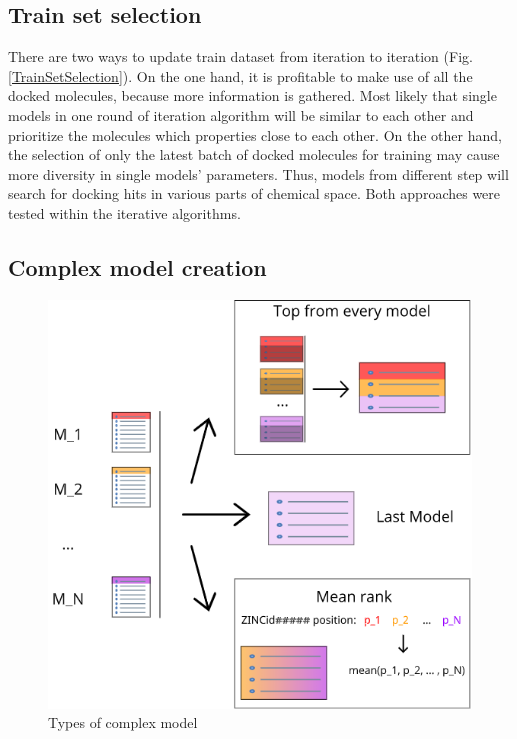 \subsection{Train set selection}
There are two ways to update train dataset from iteration to iteration (Fig. \ref{TrainSetSelection}).
On the one hand, it is profitable to make use of all the docked molecules, because 
more information is gathered.
Most likely that single models in one round of iteration algorithm will be similar 
to each other and prioritize the molecules which properties close to each other.
On the other hand, the selection of only the latest batch of docked molecules for 
training may cause more diversity in single models' parameters.
Thus, models from different step will search for docking hits in various parts of 
chemical space.
Both approaches were tested within the iterative algorithms.\\

\subsection{Complex model creation}



\begin{figure}
    \centering
    \includegraphics[scale=0.8]{Images/image2.png}
    \caption{Types of complex model}
    \label{ComplexModels}
\end{figure}

